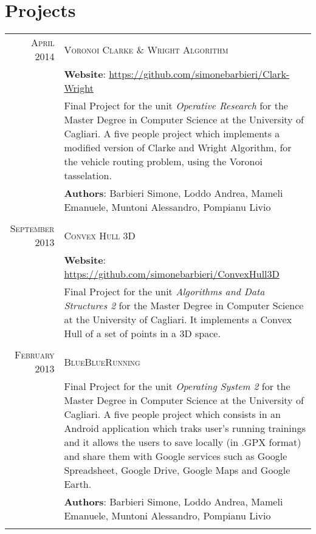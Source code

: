 \documentclass[a4paper,10pt]{article} %
\begin{document}

\section{Projects}
\begin{longtable}{rp{11cm}}

\textsc{April} 2014 & \textsc{Voronoi Clarke \& Wright Algorithm}\\
& \textbf{Website}: \href{https://github.com/simonebarbieri/Clark-Wright}{https://github.com/simonebarbieri/Clark-Wright}\\
& Final Project for the unit \textit{Operative Research} for the Master Degree in Computer Science at the University of Cagliari. A five people project which implements a modified version of Clarke and Wright Algorithm, for the vehicle routing problem, using the Voronoi tasselation.\\
& \small \textbf{Authors}: Barbieri Simone, Loddo Andrea, Mameli Emanuele, Muntoni Alessandro, Pompianu Livio\\
& \\

\textsc{September} 2013 & \textsc{Convex Hull 3D}\\
& \textbf{Website}: \href{https://github.com/simonebarbieri/ConvexHull3D}{https://github.com/simonebarbieri/ConvexHull3D}\\
& Final Project for the unit \textit{Algorithms and Data Structures 2} for the Master Degree in Computer Science at the University of Cagliari. It implements a Convex Hull of a set of points in a 3D space.\\
& \\

\textsc{February} 2013 & \textsc{BlueBlueRunning}\\
& Final Project for the unit \textit{Operating System 2} for the Master Degree in Computer Science at the University of Cagliari. A five people project which consists in an Android application which traks user's running trainings and it allows the users to save locally (in .GPX format) and share them with Google services such as Google Spreadsheet, Google Drive, Google Maps and Google Earth.\\
& \small \textbf{Authors}: Barbieri Simone, Loddo Andrea, Mameli Emanuele, Muntoni Alessandro, Pompianu Livio\\
& \\


\end{longtable}
\end{document}
